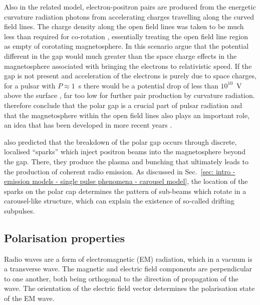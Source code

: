 Also in the related \citet{Sxxx1971} model, electron-positron pairs are produced from the energetic curvature radiation photons from accelerating charges travelling along the curved field lines. The charge density along the open field lines was taken to be much less than required for co-rotation \citet{GJxx1969}, essentially treating the open field line region as empty of corotating magnetosphere. In this scenario \citet{RSxx1975} argue that the potential different in the gap would much greater than the space charge effects in the magnetosphere associated with bringing the electrons to relativistic speed. If the gap is not present and acceleration of the electrons is purely due to space charges, for a pulsar with $P\approx1$~s there would be a potential drop of less than $10^{10}$~V above the surface \citep{Mxxx1974}, far too low for further pair production by curvature radiation. \citet{RSxx1975} therefore conclude that the polar gap is a crucial part of pulsar radiation and that the magnetosphere within the open field lines also plays an important role, an idea that has been developed in more recent years \citep[e.g.][]{CRxx1980,ZQHx1997a,Txxx2010, SMGx2015}.

\citet{RSxx1975} also predicted that the breakdown of the polar gap occurs through discrete, localised ``sparks'' which inject positron beams into the magnetosphere beyond the gap. There, they produce the plasma and bunching that ultimately leads to the production of coherent radio emission. As discussed in Sec.~\ref{sec: intro - emission models - single pulse phenomena - carousel model}, the location of the sparks on the polar cap determines the pattern of sub-beams which rotate in a carousel-like structure, which can explain the existence of so-called drifting subpulses.



\subsection{Polarisation properties}
\label{sec: intro - emission models - polarisation}

Radio waves are a form of electromagnetic (EM) radiation, which in a vacuum is a transverse wave. The magnetic and electric field components are perpendicular to one another, both being orthogonal to the direction of propagation of the wave. The orientation of the electric field vector determines the polarisation state of the EM wave.

